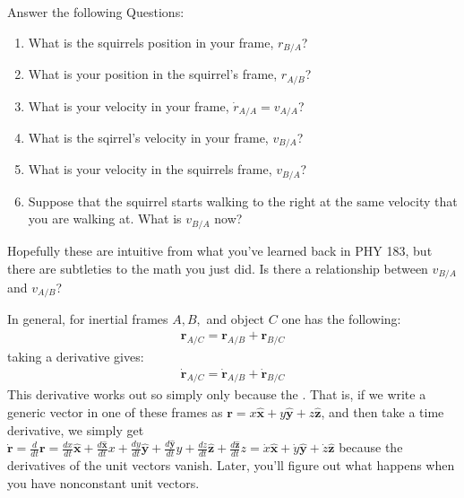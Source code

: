 \documentclass[letterpaper,10pt,english]{jupyterBook}
\begin{document}
\sphinxAtStartPar
{}

\sphinxAtStartPar
Answer the following Questions:
\begin{enumerate}
%
\item {} 
\sphinxAtStartPar
What is the squirrels position in your frame, \(r_{B/A}\)?

\item {} 
\sphinxAtStartPar
What is your position in the squirrel’s frame, \(r_{A/B}\)?

\item {} 
\sphinxAtStartPar
What is your velocity in your frame, \(\dot{r}_{A/A} = v_{A/A}\)?

\item {} 
\sphinxAtStartPar
What is the sqirrel’s velocity in your frame, \(v_{B/A}\)?

\item {} 
\sphinxAtStartPar
What is your velocity in the squirrels frame, \(v_{B/A}\)?

\item {} 
\sphinxAtStartPar
Suppose that the squirrel starts walking to the right at the same velocity that you are walking at. What is \(v_{B/A}\) now?

\end{enumerate}

\sphinxAtStartPar
Hopefully these are intuitive from what you’ve learned back in PHY 183, but there are subtleties to the math you just did. Is there a relationship between \(v_{B/A}\) and \(v_{A/B}\)?

\sphinxAtStartPar
In general, for inertial frames \(A,B,\) and object \(C\) one has the following:
\begin{equation*}
\begin{split}\mathbf{r}_{A/C} = \mathbf{r}_{A/B} + \mathbf{r}_{B/C} \end{split}
\end{equation*}
\sphinxAtStartPar
taking a derivative gives:
\begin{equation*}
\begin{split}\dot{\mathbf{r}}_{A/C} = \dot{\mathbf{r}}_{A/B} + \dot{\mathbf{r}}_{B/C} \end{split}
\end{equation*}
\sphinxAtStartPar
This derivative works out so simply only because the . That is, if we write a generic vector in one of these frames as \(\mathbf{r} = x\mathbf{\hat x} + y\mathbf{\hat y} + z \mathbf{\hat z}\), and then take a time derivative, we simply get \(\dot{\mathbf{r}} = \frac{d}{dt} \mathbf{r} = \frac{dx}{dt}\mathbf{\hat x} + \frac{d\mathbf{\hat x}}{dt} x + \frac{dy}{dt}\mathbf{\hat y} + \frac{d\mathbf{\hat y}}{dt} y + \frac{dz}{dt}\mathbf{\hat z} + \frac{d\mathbf{\hat z}}{dt} z = \dot{x}\mathbf{\hat x} + \dot{y}\mathbf{\hat y} + \dot{z} \mathbf{\hat z}\) because the derivatives of the unit vectors vanish. Later, you’ll figure out what happens when you have non\sphinxhyphen{}constant unit vectors.
\end{document}
